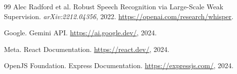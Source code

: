 \documentclass[12pt,twoside,letterpaper]{article}
\begin{document}
\newpage

\begin{thebibliography}{99}
Alec Radford et al.
\newblock Robust Speech Recognition via Large-Scale Weak Supervision.
\newblock \emph{arXiv:2212.04356}, 2022.
\newblock \url{https://openai.com/research/whisper}.

Google.
\newblock Gemini API.
\newblock \url{https://ai.google.dev/}, 2024.

Meta.
\newblock React Documentation.
\newblock \url{https://react.dev/}, 2024.

OpenJS Foundation.
\newblock Express Documentation.
\newblock \url{https://expressjs.com/}, 2024.
\end{thebibliography}
\end{document}
